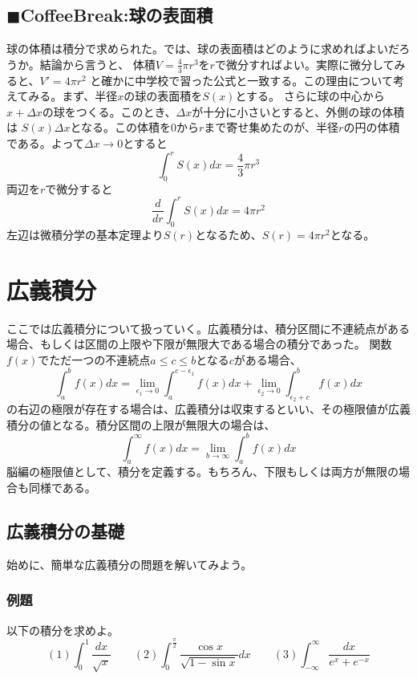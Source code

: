 \documentclass[a4j,dvipdfmx]{jsarticle}
\begin{document}
\subsection{$\blacksquare$CoffeeBreak:球の表面積}
\begin{screen}
    球の体積は積分で求められた。では、球の表面積はどのように求めればよいだろうか。結論から言うと、
    体積$\displaystyle V=\frac{4}{3}\pi r^3$を$r$で微分すればよい。実際に微分してみると、$V'=4\pi r^2$
    と確かに中学校で習った公式と一致する。この理由について考えてみる。まず、半径$x$の球の表面積を$S(x)$とする。
    さらに球の中心から$x+\Delta x$の球をつくる。このとき、$\Delta x$が十分に小さいとすると、外側の球の体積は
    $S(x)\Delta x$となる。この体積を$0$から$r$まで寄せ集めたのが、半径$r$の円の体積である。よって$\Delta x\to 0$とすると
    \begin{equation*}
        \int_0^r S(x)dx=\frac{4}{3}\pi r^3
    \end{equation*}
    両辺を$r$で微分すると
    \begin{equation*}
        \frac{d}{dr}\int_0^r S(x)dx=4\pi r^2
    \end{equation*}
    左辺は微積分学の基本定理より$S(r)$となるため、$S(r)=4\pi r^2$となる。
\end{screen}
\newpage
\section{広義積分}
ここでは広義積分について扱っていく。広義積分は、積分区間に不連続点がある場合、もしくは区間の上限や下限が無限大である場合の積分であった。
関数$f(x)$でただ一つの不連続点$a\leq c\leq b$となる$c$がある場合、
\begin{equation*}
    \int_a^b f(x)dx=\lim_{\epsilon_1\to 0}\int_a^{c-\epsilon_1}f(x)dx+\lim_{\epsilon_2\to 0}\int_{\epsilon_2+c}^b f(x)dx
\end{equation*}
の右辺の極限が存在する場合は、広義積分は収束するといい、その極限値が広義積分の値となる。積分区間の上限が無限大の場合は、
\begin{equation*}
    \int_a^\infty f(x)dx=\lim_{b\to\infty}\int_a^b f(x)dx
\end{equation*}
脳編の極限値として、積分を定義する。もちろん、下限もしくは両方が無限の場合も同様である。
\subsection{広義積分の基礎}
始めに、簡単な広義積分の問題を解いてみよう。
\subsubsection*{例題}
以下の積分を求めよ。
\begin{equation*}
    (1)\int_0^1\frac{dx}{\sqrt{x}}\qquad(2)\int_0^\frac{\pi}{2} \frac{\cos x}{\sqrt{1-\sin x}}dx\qquad (3)\int_{-\infty}^\infty \frac{dx}{e^x+e^{-x}}
\end{equation*}
\end{document}
